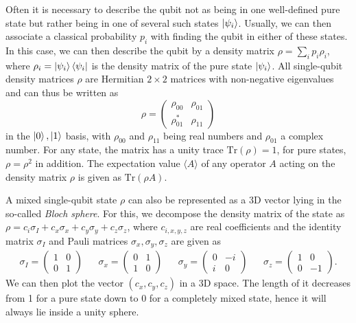 \smallskip

\smallskip

Often it is necessary to describe the qubit not as being in one well-defined pure state but rather being in one of several such states $\left| \psi_i \right>$. Usually, we can then associate a classical probability $p_i$ with finding the qubit in either of these states. In this case, we can then describe the qubit by a density matrix $\rho = \sum\limits_i p_i \rho_i$, where $\rho_i=\left| \psi_{i} \right>\left< \psi_{i} \right|$ is the density matrix of the pure state $\left| \psi_i \right>$. All single-qubit density matrices $\rho$ are Hermitian $2\times 2$ matrices with non-negative eigenvalues and can thus be written as
%
\begin{equation}
\rho = \left( \begin{array}{cc} \rho_{00} & \rho_{01} \\ \rho_{01}^* & \rho_{11} \end{array} \right)
\end{equation}
%
in the ${\left| 0 \right>,\left| 1 \right>}$ basis, with $\rho_{00}$ and $\rho_{11}$ being real numbers and $\rho_{01}$ a complex number. For any state, the matrix has a unity trace $\mathrm{Tr}(\rho)=1$, for pure states, $\rho=\rho^2$ in addition. The expectation value $\langle A \rangle$ of any operator $A$ acting on the density matrix $\rho$ is given as $\mathrm{Tr}(\rho A)$.

\smallskip

A mixed single-qubit state $\rho$ can also be represented as a 3D vector lying in the so-called {\it Bloch sphere}. For this, we decompose the density matrix of the state as $\rho = c_i\sigma_I+c_x\sigma_x+c_y\sigma_y+c_z\sigma_z$, where $c_{i,x,y,z}$ are real coefficients and the identity matrix $\sigma_I$ and Pauli matrices $\sigma_x,\sigma_y,\sigma_z$ are given as
%
\begin{align}
  \sigma_I  =  \left( \begin{array}{cc} 1 & 0 \\ 0 & 1 \end{array} \right)
 & &  \sigma_x  =  \left( \begin{array}{cc} 0 & 1 \\ 1 & 0 \end{array} \right)
  & & \sigma_y  =  \left( \begin{array}{cc} 0 & -i \\ i  &  0\end{array} \right)
  & & \sigma_z  =  \left( \begin{array}{cc} 1 & 0 \\ 0 & -1 \end{array} \right).
\label{eq:pauli_operators}
\end{align}
% 
We can then plot the vector $(c_x,c_y,c_z)$ in a 3D space. The length of it decreases from 1 for a pure state down to 0 for a completely mixed state, hence it will always lie inside a unity sphere.

